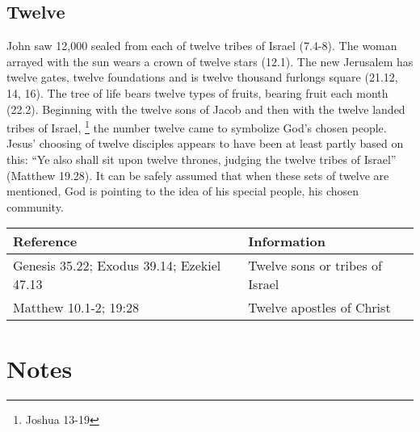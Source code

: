 
\section*{Twelve}
John saw 12,000 sealed from each of twelve tribes of Israel (7.4-8). The woman arrayed with the sun wears a crown of twelve stars (12.1). The new Jerusalem has twelve gates, twelve foundations and is twelve thousand furlongs square (21.12, 14, 16). The tree of life bears twelve types of fruits, bearing fruit each month (22.2). 
\newline\newline
Beginning with the twelve sons of Jacob and then with the twelve landed tribes of Israel,%
\footnote{Joshua 13-19} %
the number twelve came to symbolize God's chosen people. Jesus' choosing of twelve disciples appears to have been at least partly based on this: ``Ye also shall sit upon twelve thrones, judging the twelve tribes of Israel'' (Matthew 19.28). 
\newline\newline
It can be safely assumed that when these sets of twelve are mentioned, God is pointing to the idea of his special people, his chosen community.
\newline\newline
\begin{tabularx}{\textwidth}{l X}
\toprule
\textbf{Reference} & \textbf{Information}\\
\midrule
Genesis 35.22; Exodus 39.14; Ezekiel 47.13 & Twelve sons or tribes of Israel \\
\addlinespace
Matthew 10.1-2; 19:28 & Twelve apostles of Christ \\
\bottomrule
\end{tabularx}

\printindex[gen]
\chapter{Notes}
\renewcommand*{\BRbooktitlestyle}[1]{\textbf{#1}\nopagebreak}
\clearpage
{}
\printindex[scr]